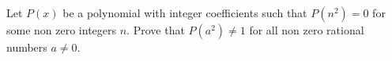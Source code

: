 Let $ P(x)$ be a polynomial with integer coefficients such that $ P(n^2) = 0$ for some non zero integers $ n.$ Prove that $ P(a^2)\neq 1$ for all non zero rational numbers $ a\neq 0.$